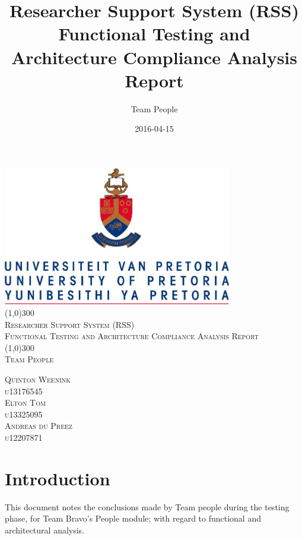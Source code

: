 \documentclass{article}
\title{
Researcher Support System (RSS)\\
Functional Testing and Architecture Compliance Analysis Report
}
\date{2016-04-15}
\author{Team People}
\begin{document}
\begin{titlepage}
	\begin{center}
		\includegraphics[width=10cm]{UP.jpg}  \\
		[1cm]
		\line(1,0){300} \\
		[0.3cm]
		\textsc{\Large
			Researcher Support System (RSS)\\
			Functional Testing and Architecture Compliance Analysis Report
		}\\
		[0.1cm]
		\line(1,0){300} \\
		[0.4cm]
		\textsc{\Large
			Team People
		} \\

	\end{center}
	\begin{flushright}
	\textsc{\Large
	Quinton Weenink\\ 
	u13176545\\
	Elton Tom\\ 
	u13325095\\ 
	Andreas du Preez\\ 
	u12207871\\ 
	}
	
	\end{flushright}
\end{titlepage}

\tableofcontents
\thispagestyle{empty}
\cleardoublepage

\setcounter{page}{1}
\section{Introduction}
This document notes the conclusions made by Team people during the testing phase, for Team Bravo's People module; with regard to functional and architectural analysis. \\

\newpage
\end{document}
